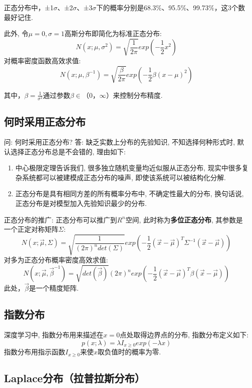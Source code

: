 正态分布中，±1\(\sigma\)、±2\(\sigma\)、±3\(\sigma\)下的概率分别是68.3\%、95.5\%、99.73\%，这3个数最好记住.

此外, 令\(\mu=0,\sigma=1​\)高斯分布即简化为标准正态分布: \[
N(x;\mu,\sigma^2) = \sqrt{\frac{1}{2\pi}}exp\left ( -\frac{1}{2}x^2 \right )
\] 对概率密度函数高效求值: \[
N(x;\mu,\beta^{-1})=\sqrt{\frac{\beta}{2\pi}}exp\left(-\frac{1}{2}\beta(x-\mu)^2\right)
\]

其中，\(\beta=\frac{1}{\sigma^2}\)通过参数\(\beta∈（0，\infty）​\)来控制分布精度.

\subsection{何时采用正态分布}\label{ux4f55ux65f6ux91c7ux7528ux6b63ux6001ux5206ux5e03}

问: 何时采用正态分布? 答: 缺乏实数上分布的先验知识, 不知选择何种形式时,
默认选择正态分布总是不会错的, 理由如下:

\begin{enumerate}
\def\labelenumi{\arabic{enumi}.}
 
\item
  中心极限定理告诉我们, 很多独立随机变量均近似服从正态分布,
  现实中很多复杂系统都可以被建模成正态分布的噪声,
  即使该系统可以被结构化分解.
\item
  正态分布是具有相同方差的所有概率分布中, 不确定性最大的分布, 换句话说,
  正态分布是对模型加入先验知识最少的分布.
\end{enumerate}

正态分布的推广: 正态分布可以推广到\(R^n\)空间,
此时称为\textbf{多位正态分布}, 其参数是一个正定对称矩阵\(\Sigma​\): \[
N(x;\vec\mu,\Sigma)=\sqrt{\frac{1}{(2\pi)^ndet(\Sigma)}}exp\left(-\frac{1}{2}(\vec{x}-\vec{\mu})^T\Sigma^{-1}(\vec{x}-\vec{\mu})\right)
\] 对多为正态分布概率密度高效求值: \[
N(x;\vec{\mu},\vec\beta^{-1}) = \sqrt{det(\vec\beta)}{(2\pi)^n}exp\left(-\frac{1}{2}(\vec{x}-\vec\mu)^T\beta(\vec{x}-\vec\mu)\right)
\] 此处，\(\vec\beta\)是一个精度矩阵.

\subsection{ 指数分布}\label{ux6307ux6570ux5206ux5e03}

深度学习中, 指数分布用来描述在\(x=0​\)点处取得边界点的分布,
指数分布定义如下: \[
p(x;\lambda)=\lambda I_{x\geq 0}exp(-\lambda{x})
\] 指数分布用指示函数\(I_{x\geq 0}​\)来使\(x​\)取负值时的概率为零.

\subsection{ Laplace分布（拉普拉斯分布）}\label{laplace-ux5206ux5e03ux62c9ux666eux62c9ux65afux5206ux5e03}

